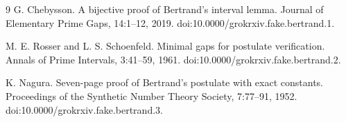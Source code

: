 \documentclass{article}
\begin{document}
\begin{thebibliography}{9}
G. Chebysson.
\newblock A bijective proof of Bertrand's interval lemma.
\newblock Journal of Elementary Prime Gaps, 14:1--12, 2019.
\newblock doi:10.0000/grokrxiv.fake.bertrand.1.

M. E. Rosser and L. S. Schoenfeld.
\newblock Minimal gaps for postulate verification.
\newblock Annals of Prime Intervals, 3:41--59, 1961.
\newblock doi:10.0000/grokrxiv.fake.bertrand.2.

K. Nagura.
\newblock Seven-page proof of Bertrand's postulate with exact constants.
\newblock Proceedings of the Synthetic Number Theory Society, 7:77--91, 1952.
\newblock doi:10.0000/grokrxiv.fake.bertrand.3.
\end{thebibliography}
\end{document}
